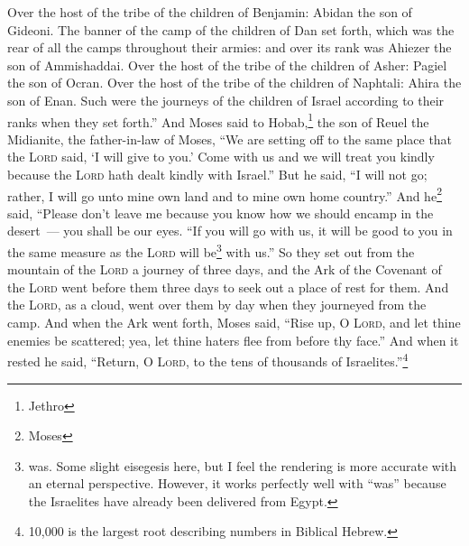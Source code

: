 \begin{enumerate*}[mode=unboxed]
     Over the host of the tribe of the children of Benjamin: Abidan the son of Gideoni.%
     The banner of the camp of the children of Dan set forth, which was the rear of all the camps throughout their armies: and over its rank was Ahiezer the son of Ammishaddai.%
     Over the host of the tribe of the children of Asher: Pagiel the son of Ocran.%
     Over the host of the tribe of the children of Naphtali: Ahira the son of Enan.%
     Such were the journeys of the children of Israel according to their ranks when they set forth.''%
     And Moses said to Hobab,\footnote{Jethro} the son of Reuel the Midianite, the father-in-law of Moses, ``We are setting off to the same place that the \textsc{Lord} said, `I will give to you.' Come with us and we will treat you kindly because the \textsc{Lord} hath dealt kindly with Israel.''%
     But he said, ``I will not go; rather, I will go unto mine own land and to mine own home country.''%
     And he\footnote{Moses} said, ``Please don't leave me because you know how we should encamp in the desert~--- you shall be our eyes.%
     ``If you will go with us, it will be good to you in the same measure as the \textsc{Lord} will be\footnote{was. Some slight eisegesis here, but I feel the rendering is more accurate with an eternal perspective. However, it works perfectly well with ``was'' because the Israelites have already been delivered from Egypt.} with us.''%
     So they set out from the mountain of the \textsc{Lord} a journey of three days, and the Ark of the Covenant of the \textsc{Lord} went before them three days to seek out a place of rest for them.%
     And the \textsc{Lord}, as a cloud, went over them by day when they journeyed from the camp.%
     And when the Ark went forth, Moses said, ``Rise up, O \textsc{Lord}, and let thine enemies be scattered; yea, let thine haters flee from before thy face.''%
     And when it rested he said, ``Return, O \textsc{Lord}, to the tens of thousands of Israelites.''\footnote{10,000 is the largest root describing numbers in Biblical Hebrew.}%
\end{enumerate*}

